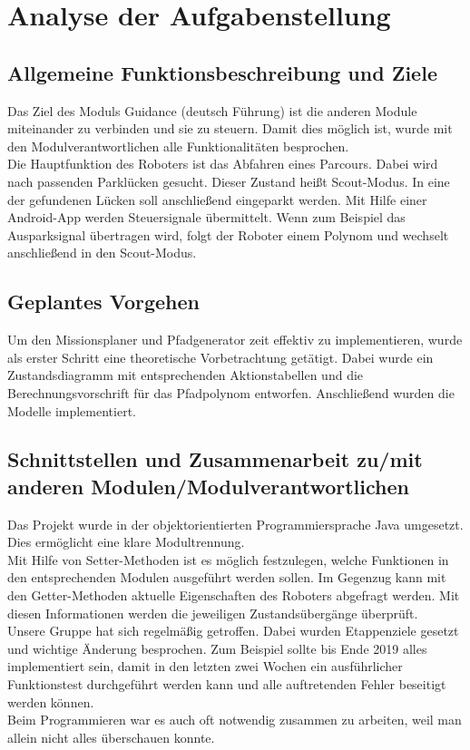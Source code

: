\chapter{Analyse der Aufgabenstellung}


\section{Allgemeine Funktionsbeschreibung und Ziele}

Das Ziel des Moduls Guidance (deutsch Führung) ist die anderen Module miteinander zu verbinden und sie zu steuern. 
Damit dies möglich ist, wurde mit den Modulverantwortlichen alle Funktionalitäten besprochen. \\

\noindent Die Hauptfunktion des Roboters ist das Abfahren eines Parcours. Dabei wird nach passenden Parklücken gesucht. Dieser Zustand heißt Scout-Modus.
In eine der gefundenen Lücken soll anschließend eingeparkt werden. Mit Hilfe einer Android-App werden Steuersignale übermittelt. Wenn zum Beispiel das Ausparksignal übertragen wird, folgt der Roboter einem Polynom und wechselt anschließend in den Scout-Modus.

\section{Geplantes Vorgehen}

Um den Missionsplaner und Pfadgenerator zeit effektiv zu implementieren, wurde als erster Schritt eine theoretische Vorbetrachtung getätigt. Dabei wurde ein Zustandsdiagramm mit entsprechenden Aktionstabellen und die Berechnungsvorschrift für das Pfadpolynom entworfen. Anschließend wurden die Modelle implementiert.

\section{Schnittstellen und Zusammenarbeit zu/mit anderen Modulen/Modulverantwortlichen}

Das Projekt wurde in der objektorientierten Programmiersprache Java umgesetzt. Dies ermöglicht eine klare Modultrennung.\\


\noindent Mit Hilfe von Setter-Methoden ist es möglich festzulegen, welche Funktionen in den entsprechenden Modulen ausgeführt werden sollen.
Im Gegenzug kann mit den Getter-Methoden aktuelle Eigenschaften des Roboters abgefragt werden. Mit diesen Informationen werden die jeweiligen Zustandsübergänge überprüft.\\

\noindent Unsere Gruppe hat sich regelmäßig getroffen. Dabei wurden Etappenziele gesetzt und wichtige Änderung besprochen. Zum Beispiel sollte bis Ende 2019 alles implementiert sein, damit in den letzten zwei Wochen ein ausführlicher Funktionstest durchgeführt werden kann und alle auftretenden Fehler beseitigt werden können.\\

\noindent Beim Programmieren war es auch oft notwendig zusammen zu arbeiten, weil man allein nicht alles überschauen konnte.